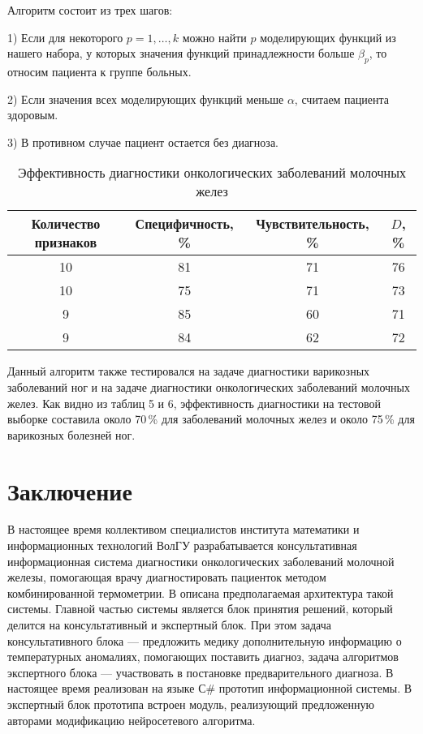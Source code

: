  Алгоритм состоит из трех шагов:

1)	Если для некоторого $p=1,\dots,k$ можно найти $p$ моделирующих функций из нашего набора, у которых значения функций принадлежности больше $\beta_p$, то относим пациента к группе больных.

2)	Если значения всех моделирующих функций меньше $\alpha$, считаем пациента здоровым.

3)	В противном случае пациент остается без диагноза.





\begin{table}[h]
	\caption{Эффективность диагностики онкологических заболеваний молочных желез}
	\centering
	\label{tabluar:tabResults}\small
	\begin{tabular}{|c|c|c|c|}
		
		\hline
		{Количество признаков} & {Специфичность, \%} & {Чувствительность, \%} &  $D$, \%  \\
		\hline
		10 & 81 & 71 & 76  \\
		\hline
		10 & 75 & 71 & 73 \\
		\hline
		9 & 85 & 60 &71  \\
		\hline
		9 & 84 & 62 & 72 \\
		\hline
		
		
		
	\end{tabular}
\end{table}

Данный алгоритм также тестировался на задаче диагностики варикозных заболеваний ног и на задаче диагностики онкологических заболеваний молочных желез. Как видно из таблиц 5 и 6, эффективность диагностики на тестовой выборке составила около 70\,\% для заболеваний молочных желез и около 75\,\% для варикозных болезней ног.

\section*{Заключение}

В настоящее время коллективом специалистов института математики и информационных технологий ВолГУ разрабатывается консультативная информационная система диагностики онкологических заболеваний молочной железы, помогающая врачу диагностировать пациенток методом комбинированной термометрии.  В \cite{zen1} описана предполагаемая архитектура такой системы. Главной частью системы является блок принятия решений, который делится на консультативный и экспертный блок. При этом задача консультативного блока --- предложить медику дополнительную информацию о температурных аномалиях, помогающих поставить диагноз, задача алгоритмов экспертного блока --- участвовать в постановке предварительного диагноза. В настоящее время реализован на языке С\# прототип информационной системы. В экспертный блок прототипа встроен модуль, реализующий предложенную авторами модификацию нейросетевого алгоритма.

